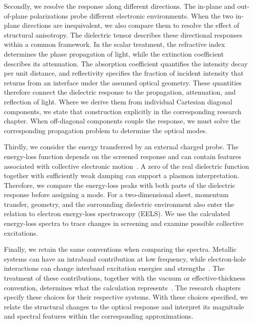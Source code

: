 Secondly, we resolve the response along different directions.
The in-plane and out-of-plane polarizations probe different electronic environments.
When the two in-plane directions are inequivalent, we also compare them to resolve the effect of structural anisotropy.
The dielectric tensor describes these directional responses within a common framework.
In the scalar treatment, the refractive index determines the phase propagation of light, while the extinction coefficient describes its attenuation.
The absorption coefficient quantifies the intensity decay per unit distance, and reflectivity specifies the fraction of incident intensity that returns from an interface under the assumed optical geometry.
These quantities therefore connect the dielectric response to the propagation, attenuation, and reflection of light.
Where we derive them from individual Cartesian diagonal components, we state that construction explicitly in the corresponding research chapter.
When off-diagonal components couple the response, we must solve the corresponding propagation problem to determine the optical modes.

Thirdly, we consider the energy transferred by an external charged probe.
The energy-loss function depends on the screened response and can contain features associated with collective electronic motion~\cite{thygesen2017}.
A zero of the real dielectric function together with sufficiently weak damping can support a plasmon interpretation.
Therefore, we compare the energy-loss peaks with both parts of the dielectric response before assigning a mode.
For a two-dimensional sheet, momentum transfer, geometry, and the surrounding dielectric environment also enter the relation to electron energy-loss spectroscopy (EELS).
We use the calculated energy-loss spectra to trace changes in screening and examine possible collective excitations.

Finally, we retain the same conventions when comparing the spectra.
Metallic systems can have an intraband contribution at low frequency, while electron-hole interactions can change interband excitation energies and strengths~\cite{onida2002electronic}.
The treatment of these contributions, together with the vacuum or effective-thickness convention, determines what the calculation represents~\cite{matthes2016influence}.
The research chapters specify these choices for their respective systems.
With these choices specified, we relate the structural changes to the optical response and interpret its magnitude and spectral features within the corresponding approximations.

